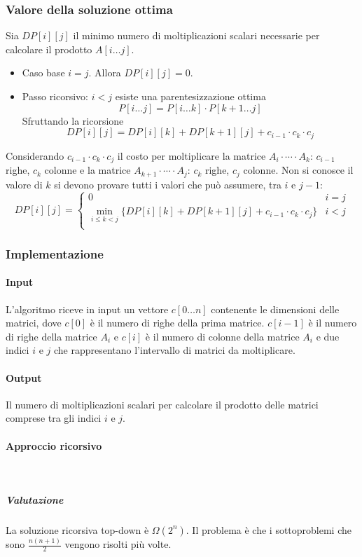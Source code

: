 \subsubsection{Valore della soluzione ottima}
Sia $DP[i][j]$ il minimo numero di moltiplicazioni scalari necessarie per calcolare il prodotto $A[i\dots j]$. 
\begin{itemize}
	\item Caso base $i=j$. Allora $DP[i][j]=0$.
	\item Passo ricorsivo: $i<j$ esiste una parentesizzazione ottima $$P[i\dots j] = P[i\dots k]\cdot P[k+1\dots j]$$ Sfruttando la ricorsione 
		$$DP[i][j] = DP[i][k]+DP[k+1][j]+c_{i-1}\cdot c_k\cdot c_j$$
\end{itemize}
Considerando $c_{i-1}\cdot c_k\cdot c_j$ il costo per moltiplicare la matrice $A_i\cdot\cdots\cdot A_k$: $c_{i-1}$ righe, $c_k$ colonne e la matrice $A_{k+1}\cdot\cdots\cdot A_j$:
$c_k$ righe, $c_j$ colonne. Non si conosce il valore di $k$ si devono provare tutti i valori che pu\`o assumere, tra $i$ e $j-1$:
$$DP[i][j] = \begin{cases}
	0 & i = j\\
	\min\limits_{i\le k < j}\{DP[i][k]+DP[k+1][j]+c_{i-1}\cdot c_k\cdot c_j\} & i < j\\
\end{cases}$$
\subsubsection{Implementazione}
\paragraph{Input}
L'algoritmo riceve in input un vettore $c[0\dots n]$ contenente le dimensioni delle matrici, dove $c[0]$ \`e il numero di righe della prima matrice. $c[i-1]$ \`e il numero di righe 
della matrice $A_i$ e $c[i]$ \`e il numero di colonne della matrice $A_i$ e due indici $i$ e $j$ che rappresentano l'intervallo di matrici da moltiplicare. 
\paragraph{Output}
Il numero di moltiplicazioni scalari per calcolare il prodotto delle matrici comprese tra gli indici $i$ e $j$.
\paragraph{Approccio ricorsivo}\mbox{}\\

\subparagraph{Valutazione}
La soluzione ricorsiva top-down \`e $\Omega(2^n)$. Il problema \`e che i sottoproblemi che sono $\frac{n(n+1)}{2}$ vengono risolti pi\`u volte.
